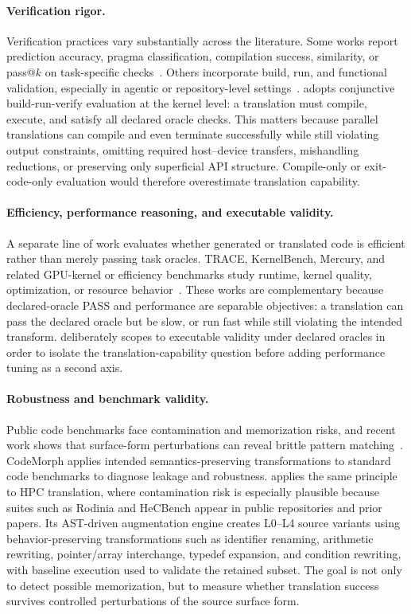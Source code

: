\paragraph{Verification rigor.}
Verification practices vary substantially across the literature. Some works report prediction accuracy, pragma classification, compilation success, similarity, or pass@$k$ on task-specific checks~\cite{LearningToParallelize2023,OMPify2023,CodeRosetta2024,HPCCoderV2}. Others incorporate build, run, and functional validation, especially in agentic or repository-level settings~\cite{LASSI2024,ParEvalRepo2025,ParaCodex2026}. \parbench{} adopts conjunctive build-run-verify evaluation at the kernel level: a translation must compile, execute, and satisfy all declared oracle checks. This matters because parallel translations can compile and even terminate successfully while still violating output constraints, omitting required host--device transfers, mishandling reductions, or preserving only superficial API structure. Compile-only or exit-code-only evaluation would therefore overestimate translation capability.

\paragraph{Efficiency, performance reasoning, and executable validity.}
A separate line of work evaluates whether generated or translated code is efficient rather than merely passing task oracles. TRACE, KernelBench, Mercury, and related GPU-kernel or efficiency benchmarks study runtime, kernel quality, optimization, or resource behavior~\cite{TRACE2026,KernelBench2025,Mercury2024}. These works are complementary because declared-oracle PASS and performance are separable objectives: a translation can pass the declared oracle but be slow, or run fast while still violating the intended transform. \parbench{} deliberately scopes to executable validity under declared oracles in order to isolate the translation-capability question before adding performance tuning as a second axis.

\paragraph{Robustness and benchmark validity.}
Public code benchmarks face contamination and memorization risks, and recent work shows that surface-form perturbations can reveal brittle pattern matching~\cite{SWEbenchIllusion2025,CodeMorph2025,MemorizeOrGeneralize2025}. CodeMorph applies intended semantics-preserving transformations to standard code benchmarks to diagnose leakage and robustness. \parbench{} applies the same principle to HPC translation, where contamination risk is especially plausible because suites such as Rodinia and HeCBench appear in public repositories and prior papers. Its AST-driven augmentation engine creates L0--L4 source variants using behavior-preserving transformations such as identifier renaming, arithmetic rewriting, pointer/array interchange, typedef expansion, and condition rewriting, with baseline execution used to validate the retained subset. The goal is not only to detect possible memorization, but to measure whether translation success survives controlled perturbations of the source surface form.


